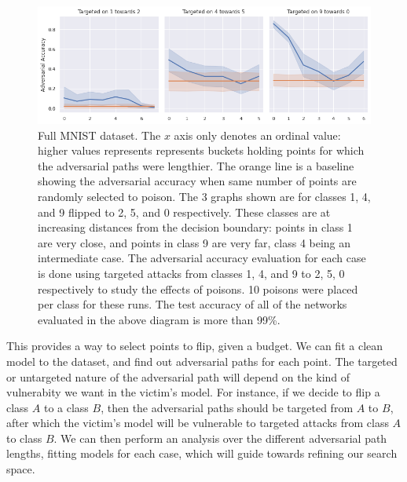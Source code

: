 \documentclass{ociamthesis}
\begin{document}
    \begin{figure}[!h]
        \centering
        \includegraphics[scale=0.5]{targeted-mnist-pgd-path-trick.png}
        \caption{Full MNIST dataset. The $x$ axis only denotes an ordinal value:
        higher values represents represents buckets holding points for which the
        adversarial paths were lengthier. The orange line is a baseline showing
        the adversarial accuracy when same number of points are randomly
        selected to poison. The 3 graphs shown are for classes 1, 4, and 9
        flipped to 2, 5, and 0 respectively. These classes are at increasing
        distances from the decision boundary: points in class 1 are very close,
        and points in class 9 are very far, class 4 being an intermediate case.
        The adversarial accuracy evaluation for each case is done using targeted
        attacks from classes 1, 4, and 9 to 2, 5, 0 respectively to study the
        effects of poisons. 10 poisons were placed per class for these runs. The
        test accuracy of all of the networks evaluated in the above diagram is
        more than 99\%.}
        \label{fig:full-MNIST-curve}
    \end{figure}


This provides a way to select points to flip, given a budget. We can fit a clean
model to the dataset, and find out adversarial paths for each point. The
targeted or untargeted nature of the adversarial path will depend on the kind of
vulnerabity we want in the victim's model. For instance, if we decide to flip a
class $A$ to a class $B$, then the adversarial paths should be targeted from $A$
to $B$, after which the victim's model will be vulnerable to targeted attacks
from class $A$ to class $B$. We can then perform an analysis over the different
adversarial path lengths, fitting models for each case, which will guide towards
refining our search space.
\end{document}

